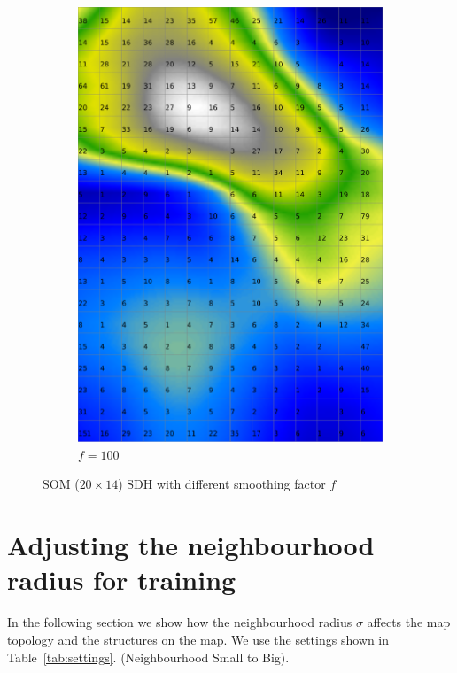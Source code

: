 \documentclass{acm_proc_article-sp}
\begin{document}
\begin{figure}
\begin{subfigure}[b]{0.30\linewidth}
        \includegraphics[width=\linewidth]{img/wine-weird-smoothed-data-histogram-100}
        \caption{$f=100$}
    \end{subfigure}
    \caption{SOM ($20\times14$) SDH with different smoothing factor $f$}
    \label{fig:wine-weird-smoothed-data-histogram-series}
\end{figure}

\section{Adjusting the neighbourhood radius for training}

In the following section we show how the neighbourhood radius $\sigma$ affects the map topology
and the structures on the map. We use the settings shown in Table~\ref{tab:settings}.
(Neighbourhood Small to Big).
\end{document}
